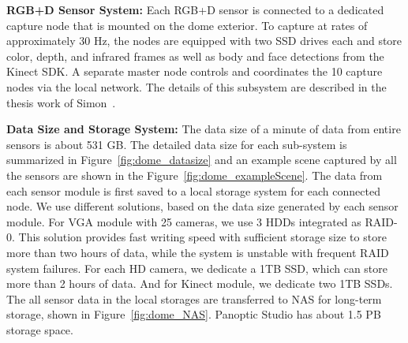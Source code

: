 \noindent \textbf{RGB+D Sensor System:} Each RGB+D sensor is connected to a dedicated capture node that is mounted on the dome exterior. To capture at rates of approximately 30 Hz, the nodes are equipped with two SSD drives each and store color, depth, and infrared frames as well as body and face detections from the Kinect SDK. A separate master node controls and coordinates the 10 capture nodes via the local network. The details of this subsystem are described in the thesis work of Simon~\cite{simon2017}.


\noindent \textbf{Data Size and Storage System:} The data size of a minute of data from entire sensors is about 531 GB. The detailed data size for each sub-system is summarized in Figure~\ref{fig:dome_datasize} and an example scene captured by all the sensors are shown in the Figure~\ref{fig:dome_exampleScene}. The data from each sensor module is first saved to a local storage system for each connected node. We use different solutions, based on the data size generated by each sensor module. For VGA module with 25 cameras, we use 3 HDDs integrated as RAID-0. This solution provides fast writing speed with sufficient storage size to store more than two hours of data, while the system is unstable with frequent RAID system failures. For each HD camera, we dedicate a 1TB SSD, which can store more than 2 hours of data. And for Kinect module, we dedicate two 1TB SSDs. The all sensor data in the local storages are transferred to NAS for long-term storage, shown in Figure~\ref{fig:dome_NAS}. Panoptic Studio has about 1.5 PB storage space.



